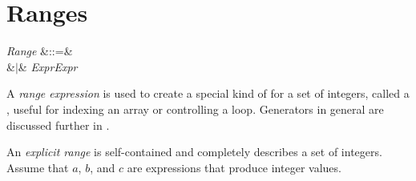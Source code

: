 %
%
%
%

\section{Ranges}


\begin{Grammar}
\emph{Range} &::=& \EXP{:}\\
&$|$& \emph{Expr}\EXP{\#}\emph{Expr}
\end{Grammar}



A \emph{range expression} is used to create a special kind of  for
a set of integers, called a , useful
for indexing an array or controlling a  loop.  Generators in
general are discussed further in .

An \emph{explicit range}
is self-contained and completely describes a set of integers.  Assume that
$a$, $b$, and $c$ are expressions that produce integer values.

